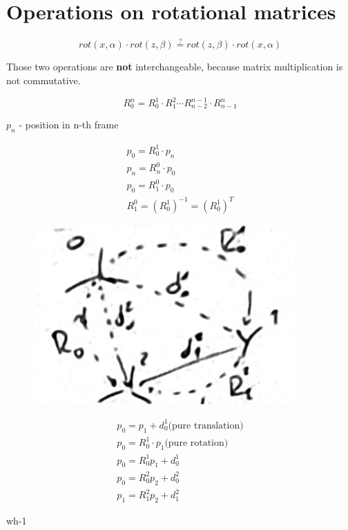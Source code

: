 \documentclass[12pt, a4paper]{extarticle}
\begin{document}
	\section{Operations on rotational matrices}

	\begin{equation}
		rot(x, \alpha) \cdot rot(z, \beta) \stackrel{?}{=} rot(z, \beta) \cdot rot(x, \alpha)
	\end{equation}

	Those two operations are \textbf{not} interchangeable, because matrix multiplication is not commutative.

	\begin{equation}
		R^n_0 = R^1_0 \cdot R^2_1 \cdots R^{n-1}_{n-2} \cdot R^n_{n-1}
	\end{equation}

	$p_n$ - position in n-th frame

	\begin{gather*}
		p_0 = R^1_0 \cdot p_n \\
		p_n = R^0_n \cdot p_0  \\
		p_0 = R^0_1 \cdot p_0 \\
		R^0_1 = (R^1_0)^{-1}=(R^1_0)^T
	\end{gather*}

	\begin{figure}[H]
		\centering
		\includegraphics[width=10cm,trim={0 0 0 0},clip]{lecture-2-photo-1.jpg}
		\label{photo:1}%
	\end{figure}

	\begin{gather*}
		p_0 = p_1 + d^1_0  \text{(pure translation)} \\
		p_0 = R^1_0 \cdot p_1  \text{(pure rotation)} \\
		p_0 = R^1_0 p_1 + d^1_0 \\
		p_0 = R^2_0 p_2 + d^2_0 \\
		p_1 = R^2_1 p_2 + d^2_1
	\end{gather*}

	wh-1
\end{document}
